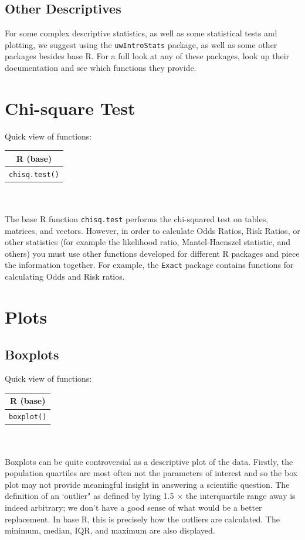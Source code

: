 \documentclass[11pt,letterpaper,fleqn]{report}
\begin{document}
\section{Other Descriptives}
For some complex descriptive statistics, as well as some statistical tests and plotting, we suggest using the \texttt{uwIntroStats} package, as well as some other packages besides base R. For a full look at any of these packages, look up their documentation and see which functions they provide. 

\chapter{Chi-square Test}
Quick view of functions:
\begin{tabular}{c}
 R (base)\\
\hline
\texttt{chisq.test()}\\
\end{tabular}\\
\\
The base R function \texttt{chisq.test} performs the chi-squared test on tables, matrices, and vectors. However, in order to calculate Odds Ratios, Risk Ratios, or other statistics (for example the likelihood ratio, Mantel-Haenszel statistic, and others) you must use other functions developed for different R packages and piece the information together. For example, the \texttt{Exact} package contains functions for calculating Odds and Risk ratios.

\chapter{Plots}

\section{Boxplots}
Quick view of functions:
\begin{tabular}{c}
R (base) \\
\hline
\texttt{boxplot()}
\end{tabular}\\
\\
Boxplots can be quite controversial as a descriptive plot of the data. Firstly, the population quartiles are most often not the parameters of interest and so the box plot may not provide meaningful insight in answering a scientific question. The definition of an `outlier" as defined by lying 1.5 $\times$ the interquartile range away is indeed arbitrary; we don't have a good sense of what would be a better replacement. In base R, this is precisely how the outliers are calculated. The minimum, median, IQR, and maximum are also displayed.
\end{document}
